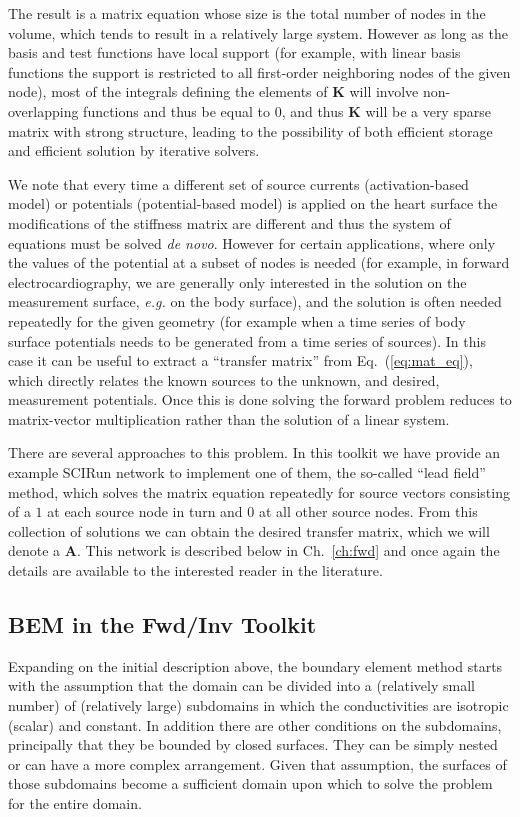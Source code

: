 The result is a matrix equation whose size is the total number of nodes in
the volume, which tends to result in a relatively large system. However as
long as the basis and test functions have local support (for example, with
linear basis functions the support is restricted to all first-order
neighboring nodes of the given node), most of the integrals defining the
elements of $\mathbf{K}$ will involve non-overlapping functions and thus be
equal to $0$, and thus $\mathbf{K}$ will be a very sparse matrix with
strong structure, leading to the possibility of both efficient storage and
efficient solution by iterative solvers. 

We note that every time a different set of source currents
(activation-based model) or potentials (potential-based model) is applied
on the heart surface the modifications of the stiffness matrix are
different and thus the system of equations must be solved \textit{de
novo}. However for certain applications, where only the values of the potential at
a subset of nodes is needed (for example, in forward electrocardiography,
we are generally only interested in the solution on the measurement
surface, \textit{e.g.} on the body surface), and the solution 
is often needed repeatedly for the given geometry (for example when a time
series of body surface potentials needs to be generated from a time series
of sources). In this case it can be useful to extract a ``transfer matrix''
from Eq.~(\ref{eq:mat_eq}), which directly relates the known sources to the
unknown, and desired, measurement potentials. Once this is done solving the
forward problem reduces to matrix-vector multiplication rather than the
solution of a linear system.

There are several approaches to this problem. In this toolkit we have
provide an example SCIRun network to implement one of them, the so-called
``lead field'' method, which solves the matrix equation repeatedly for
source vectors consisting of a $1$ at each source node in turn and $0$ at
all other source nodes. From this collection of solutions we can obtain the
desired transfer matrix, which we will denote a $\mathbf{A}$.  This network is described below in
Ch.~\ref{ch:fwd} and once again the details are available to the interested
reader in the literature.

\subsection{BEM in the Fwd/Inv Toolkit}

Expanding on the initial description above, the boundary element method starts with the assumption
that the domain can be divided into a (relatively small number) of
(relatively large) subdomains in which the conductivities are isotropic
(scalar) and constant. In addition there are other conditions on the
subdomains, principally that they be bounded by closed surfaces. 
They can be simply nested or can have a more complex arrangement. Given
that assumption, the surfaces of those subdomains become a sufficient
domain upon which to solve the problem for the entire domain.

